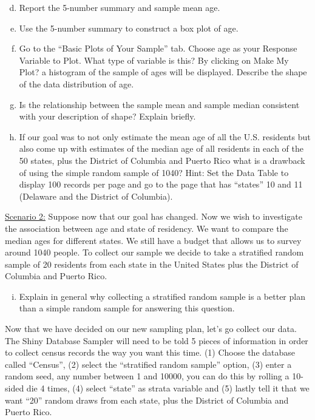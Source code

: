 \documentclass{article}\usepackage[]{graphicx}\usepackage[]{color}
\begin{document}
\begin{enumerate}[(a)]
\setcounter{enumi}{3}
\item Report the 5-number summary and sample mean age.
\item	Use the 5-number summary to construct a box plot of age.
\item	Go to the ``Basic Plots of Your Sample'' tab.  Choose age as your Response Variable to Plot.  What type of variable is this?  By clicking on Make My Plot? a histogram of the sample of ages will be displayed.  Describe the shape of the data distribution of age.
\item	Is the relationship between the sample mean and sample median consistent with your description of shape?  Explain briefly.
\item	If our goal was to not only estimate the mean age of all the U.S. residents but also come up with estimates of the median age of all residents in each of the 50 states, plus the District of Columbia and Puerto Rico what is a drawback of using the simple random sample of 1040?  Hint: Set the Data Table to display 100 records per page and go to the page that has ``states'' 10 and 11 (Delaware and the District of Columbia).
\end{enumerate}

\underline{Scenario 2:} Suppose now that our goal has changed.  Now we wish to investigate the association between age and state of residency. We want to compare the median ages for different states. We still have a budget that allows us to survey around 1040 people. To collect our sample we decide to take a stratified random sample of 20 residents from each state in the United States plus the District of Columbia and Puerto Rico. 

\begin{enumerate}[(a)]
\setcounter{enumi}{8}
\item  Explain in general why collecting a stratified random sample is a better plan than a simple random sample for answering this question.  
\end{enumerate}

Now that we have decided on our new sampling plan, let's go collect our data.  The Shiny Database Sampler will need to be told 5 pieces of information in order to collect census records the way you want this time. (1) Choose the database called ``Census'', (2) select the ``stratified random sample'' option, (3) enter a random seed, any number between 1 and 10000, you can do this by rolling a 10-sided die 4 times, (4) select ``state'' as strata variable and (5) lastly tell it that we want ``20'' random draws from each state, plus the District of Columbia and Puerto Rico.  \\
\end{document}
